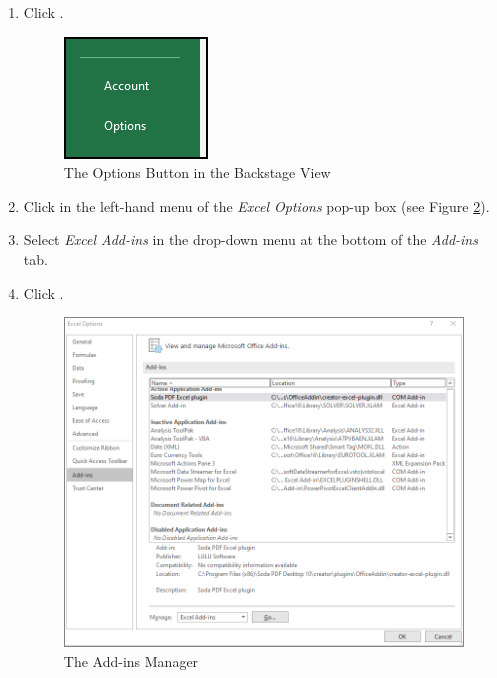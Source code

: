 \begin{enumbox}
	\begin{enumerate}
		\item Click .

		\begin{figure}[H]
			\centering
			\includegraphics[width=\maxwidth{.35\linewidth}]{gfx/ch09_fig50}
			\caption{The Options Button in the Backstage View}
			\label{09:fig50}
		\end{figure}

		\item Click  in the left-hand menu of the \textit{Excel Options} pop-up box (see Figure \ref{09:fig51}).
		\item Select \textit{Excel Add-ins} in the drop-down menu at the bottom of the \textit{Add-ins} tab.
		\item Click .

		\begin{figure}[H]
			\centering
			\includegraphics[width=\maxwidth{.95\linewidth}]{gfx/ch09_fig51}
			\caption{The Add-ins Manager}
			\label{09:fig51}
		\end{figure}


\end{enumerate}
\end{enumbox}
